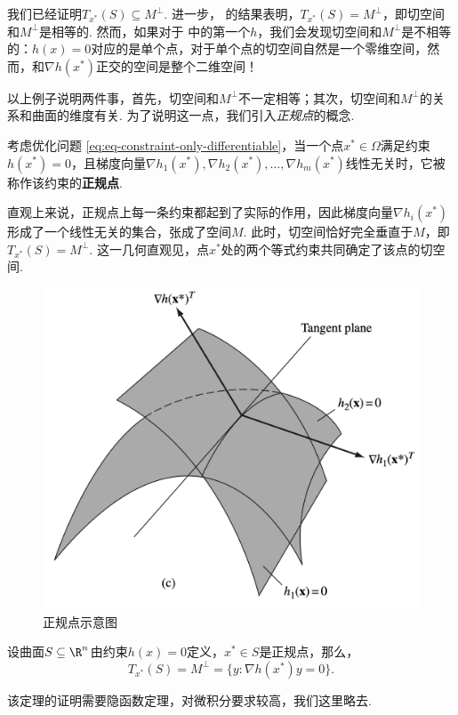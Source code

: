 我们已经证明$T_{x^*}(S)\subseteq M^\perp$. 进一步， 的结果表明，$T_{x^*}(S)=M^\perp$，即切空间和$M^\perp$是相等的. 然而，如果对于 中的第一个$h$，我们会发现切空间和$M^\perp$是不相等的：$h(x)=0$对应的是单个点，对于单个点的切空间自然是一个零维空间，然而，和$\nabla h(x^*)$正交的空间是整个二维空间！

以上例子说明两件事，首先，切空间和$M^\perp$不一定相等；其次，切空间和$M^\perp$的关系和曲面的维度有关. 为了说明这一点，我们引入\emph{正规点}的概念. 

\begin{definition}[正规点]\label{def:regular-point}
考虑优化问题 \eqref{eq:eq-constraint-only-differentiable}，当一个点$x^*\in\Omega$满足约束${h(x^*)}=0$，且梯度向量$\nabla h_1(x^*),\nabla h_2(x^*),\dots,\nabla h_m(x^*)$线性无关时，它被称作该约束的\textbf{正规点}. 
\end{definition}

直观上来说，正规点上每一条约束都起到了实际的作用，因此梯度向量$\nabla h_i(x^*)$形成了一个线性无关的集合，张成了空间$M$. 此时，切空间恰好完全垂直于$M$，即$T_{x^*}(S)=M^\perp$. 这一几何直观见，点${x^* }$处的两个等式约束共同确定了该点的切空间.
\begin{figure}
    \centering
    \includegraphics[scale=0.17]{Figures/duality/tan-2constraint.png}
    \caption{正规点示意图}
    \label{fig:tan-2constraint}
\end{figure}

\begin{theorem}[正规点切空间刻画定理]\label{thm:tan-space-characterize}
设曲面$S\subseteq\R^n$由约束$h(x)=0$定义，$x^*\in S$是正规点，那么，
\[T_{x^*}(S)=M^\perp=\{{y:\nabla h(x^*)y=0}\}.\]
\end{theorem}
该定理的证明需要隐函数定理，对微积分要求较高，我们这里略去.

